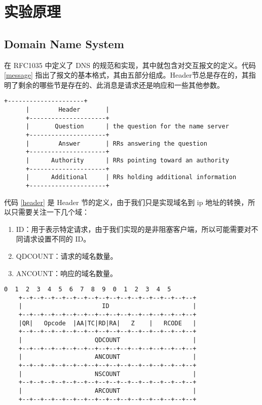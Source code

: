 \documentclass[a4paper,11pt,UTF8,AutoFakeBold= {2.88}]{ctexart}
\begin{document}
\section{实验原理}

\subsection{Domain Name System}


在 RFC1035 中定义了 DNS 的规范和实现，其中就包含对交互报文的定义。代码 \ref{message} 指出了报文的基本格式，其由五部分组成。Header节总是存在的，其指明了剩余的哪些节是存在的、此消息是请求还是响应和一些其他参数。

\begin{lstlisting}[label={message}, numbers=none,caption={DNS message format},captionpos=b]
      +---------------------+
      |        Header       |
      +---------------------+
      |       Question      | the question for the name server
      +---------------------+
      |        Answer       | RRs answering the question
      +---------------------+
      |      Authority      | RRs pointing toward an authority
      +---------------------+
      |      Additional     | RRs holding additional information
      +---------------------+
    \end{lstlisting}

代码 \ref{header} 是 Header 节的定义，由于我们只是实现域名到 ip 地址的转换，所以只需要关注一下几个域：

\begin{enumerate}
    \item ID：用于表示特定请求，由于我们实现的是非阻塞客户端，所以可能需要对不同请求设置不同的 ID。
    \item QDCOUNT：请求的域名数量。
    \item ANCOUNT：响应的域名数量。
\end{enumerate}

\begin{lstlisting}[label={header}, numbers=none,caption={Header section format}, captionpos=b]
      0  1  2  3  4  5  6  7  8  9  0  1  2  3  4  5
    +--+--+--+--+--+--+--+--+--+--+--+--+--+--+--+--+
    |                      ID                       |
    +--+--+--+--+--+--+--+--+--+--+--+--+--+--+--+--+
    |QR|   Opcode  |AA|TC|RD|RA|   Z    |   RCODE   |
    +--+--+--+--+--+--+--+--+--+--+--+--+--+--+--+--+
    |                    QDCOUNT                    |
    +--+--+--+--+--+--+--+--+--+--+--+--+--+--+--+--+
    |                    ANCOUNT                    |
    +--+--+--+--+--+--+--+--+--+--+--+--+--+--+--+--+
    |                    NSCOUNT                    |
    +--+--+--+--+--+--+--+--+--+--+--+--+--+--+--+--+
    |                    ARCOUNT                    |
    +--+--+--+--+--+--+--+--+--+--+--+--+--+--+--+--+
\end{lstlisting}
\end{document}

